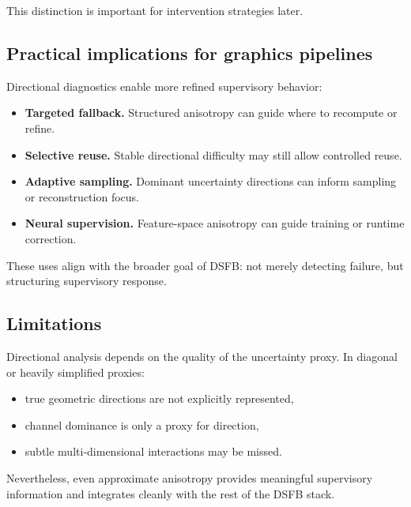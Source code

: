 \documentclass[11pt]{article}
\theoremstyle{definition}
\theoremstyle{plain}
\begin{document}
This distinction is important for intervention strategies later.


\subsection{Practical implications for graphics pipelines}

Directional diagnostics enable more refined supervisory behavior:

\begin{itemize}[leftmargin=1.5em]
    \item \textbf{Targeted fallback.} Structured anisotropy can guide where to recompute or refine.
    \item \textbf{Selective reuse.} Stable directional difficulty may still allow controlled reuse.
    \item \textbf{Adaptive sampling.} Dominant uncertainty directions can inform sampling or reconstruction focus.
    \item \textbf{Neural supervision.} Feature-space anisotropy can guide training or runtime correction.
\end{itemize}

These uses align with the broader goal of DSFB: not merely detecting failure, but structuring supervisory response.


\subsection{Limitations}

Directional analysis depends on the quality of the uncertainty proxy. In diagonal or heavily simplified proxies:
\begin{itemize}[leftmargin=1.5em]
    \item true geometric directions are not explicitly represented,
    \item channel dominance is only a proxy for direction,
    \item subtle multi-dimensional interactions may be missed.
\end{itemize}

Nevertheless, even approximate anisotropy provides meaningful supervisory information and integrates cleanly with the rest of the DSFB stack.
\end{document}

